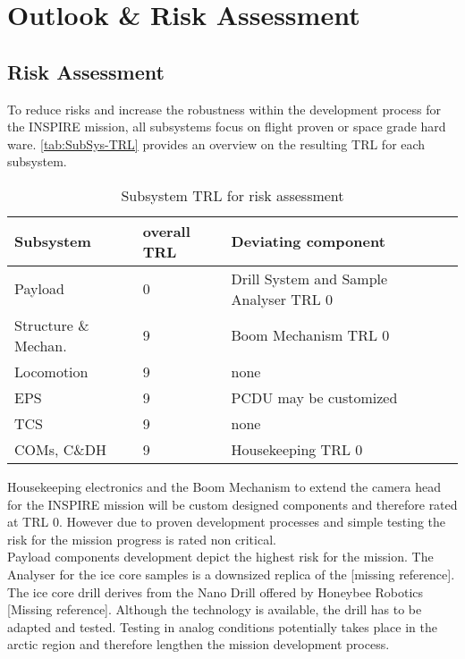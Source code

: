 \chapter{Outlook \& Risk Assessment}
\label{chap:outlook}

\section{Risk Assessment}
\label{sec:RiskAssessment}

To reduce risks and increase the robustness within the development process for the INSPIRE mission, all subsystems focus on flight proven or space grade hard ware. \autoref{tab:SubSys-TRL} provides an overview on the resulting TRL for each subsystem. 
 
\begin{table}[h]
\centering
\begin{tabular}{llll}
Subsystem            & overall TRL & Deviating component      &  \\ \hline\hline
Payload              & 0           & Drill System and Sample Analyser TRL 0 &  \\
Structure \& Mechan. & 9           & Boom Mechanism TRL 0     &  \\
Locomotion           & 9           & none                     &  \\
EPS                  & 9           & PCDU may be customized                     &  \\
TCS                  & 9           & none                     &  \\
COMs, C\&DH          & 9           & Housekeeping TRL 0       & 	 \\ \hline
\end{tabular}
\caption{Subsystem TRL for risk assessment}
\label{tab:SubSys-TRL}
\end{table}

Housekeeping electronics and the Boom Mechanism to extend the camera head for the INSPIRE mission will be custom designed components and therefore rated at TRL 0. However due to proven development processes and simple testing the risk for the mission progress is rated non critical.  \\

Payload components development depict the highest risk for the mission. The Analyser for the ice core samples is a downsized replica of the [missing reference]. 
The ice core drill derives from the Nano Drill offered by Honeybee Robotics [Missing reference]. Although the technology is available, the drill has to be adapted and tested. Testing in analog conditions potentially takes place in the arctic region and therefore lengthen the mission development process. \\

